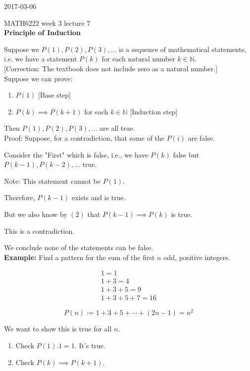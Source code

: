 \documentclass[a4paper, 11pt, twoside]{article}
\begin{document}
2017-03-06

MATH6222 week 3 lecture 7\\

\textbf{Principle of Induction}

Suppose we $P(1), P(2), P(3), \dots$ is a sequence of mathematical statements, i.e. we have a statement $P(k)$ for each natural number $k \in \mathbb{N}$.\\

[Correction: The textbook does not include zero as a natural number.]\\

Suppose we can prove:

\begin{enumerate}
	\item $P(1)$ [Base step]
	\item $P(k) \implies P(k+1)$ for each $k\in\mathbb{N}$ [Induction step]
\end{enumerate}

Then $P(1), P(2), P(3), \dots$ are all true.\\

Proof: Suppose, for a contradiction, that some of the $P(i)$ are false.

Consider the "First" which is false, i.e., we have $P(k)$ false but $P(k-1), P(k-2), \dots$ true.

Note: This statement cannot be $P(1)$.

Therefore, $P(k-1)$ exists and is true.

But we also know by $(2)$ that $P(k-1)\implies P(k)$ is true.

This is a contradiction.

We conclude none of the statements can be false.\\

\textbf{Example:} Find a pattern for the sum of the first $n$ odd, positive integers.

\[
\begin{split}
1=1\\1+3=4\\1+3+5=9\\1+3+5+7=16	
\end{split}
\]

\[P(n):= 1+3+5+\cdots +(2n-1)=n^2\]

We want to show this is true for all $n$.

\begin{enumerate}
	\item Check $P(1). 1=1.$ It's true.
	\item Check $P(k) \implies P(k+1).$
\end{enumerate}
\end{document}
